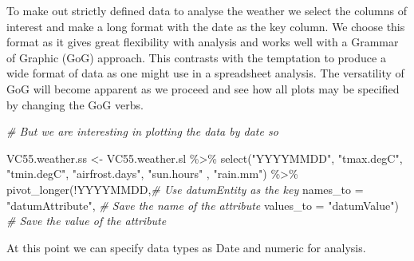 \documentclass{article}
\newenvironment{Shaded}{\begin{snugshade}}{\end{snugshade}}
\newcommand{\AttributeTok}[1]{\textcolor[rgb]{0.77,0.63,0.00}{#1}}
\newcommand{\CommentTok}[1]{\textcolor[rgb]{0.56,0.35,0.01}{\textit{#1}}}
\newcommand{\FunctionTok}[1]{\textcolor[rgb]{0.00,0.00,0.00}{#1}}
\newcommand{\NormalTok}[1]{#1}
\newcommand{\OtherTok}[1]{\textcolor[rgb]{0.56,0.35,0.01}{#1}}
\newcommand{\SpecialCharTok}[1]{\textcolor[rgb]{0.00,0.00,0.00}{#1}}
\newcommand{\StringTok}[1]{\textcolor[rgb]{0.31,0.60,0.02}{#1}}
\begin{document}
To make out strictly defined data to analyse the weather we select the columns of interest and make a long format with the date as the key column. We choose this format as it gives great flexibility with analysis and works well with a Grammar of Graphic (GoG) approach. This contrasts with the temptation to produce a wide format of data as one might use in a spreadsheet analysis. The versatility of GoG will become apparent as we proceed and see how all plots may be specified by changing the GoG verbs.

\begin{Shaded}
\begin{Highlighting}[]
\CommentTok{\# But we are interesting in plotting the data by date so}

\NormalTok{  VC55.weather.ss }\OtherTok{\textless{}{-}}\NormalTok{ VC55.weather.sl }\SpecialCharTok{\%\textgreater{}\%} 
    \FunctionTok{select}\NormalTok{(}\StringTok{"YYYYMMDD"}\NormalTok{, }
           \StringTok{"tmax.degC"}\NormalTok{,}
           \StringTok{"tmin.degC"}\NormalTok{,}
           \StringTok{"airfrost.days"}\NormalTok{, }
           \StringTok{"sun.hours"}\NormalTok{ ,}
           \StringTok{"rain.mm"}\NormalTok{)     }\SpecialCharTok{\%\textgreater{}\%}
            \FunctionTok{pivot\_longer}\NormalTok{(}\SpecialCharTok{!}\NormalTok{YYYYMMDD,}\CommentTok{\# Use datumEntity as the key}
                  \AttributeTok{names\_to =} \StringTok{"datumAttribute"}\NormalTok{, }\CommentTok{\# Save the name of the attribute}
                  \AttributeTok{values\_to =} \StringTok{"datumValue"}\NormalTok{) }\CommentTok{\# Save the value of the attribute}
\end{Highlighting}
\end{Shaded}

At this point we can specify data types as Date and numeric for analysis.

\begin{Shaded}
\end{Shaded}
\end{document}
